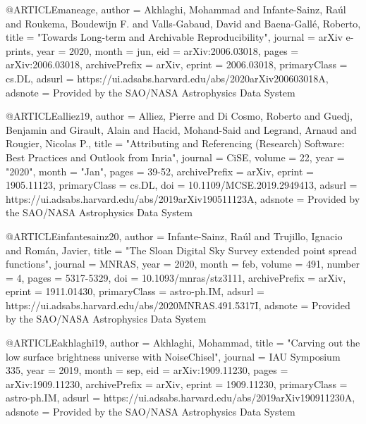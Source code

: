 %
%

@ARTICLE{maneage,
       author = {{Akhlaghi}, Mohammad and {Infante-Sainz}, Ra{\'u}l and
         {Roukema}, Boudewijn F. and {Valls-Gabaud}, David and
         {Baena-Gall{\'e}}, Roberto},
        title = "{Towards Long-term and Archivable Reproducibility}",
      journal = {arXiv e-prints},
         year = 2020,
        month = jun,
          eid = {arXiv:2006.03018},
        pages = {arXiv:2006.03018},
archivePrefix = {arXiv},
       eprint = {2006.03018},
 primaryClass = {cs.DL},
       adsurl = {https://ui.adsabs.harvard.edu/abs/2020arXiv200603018A},
      adsnote = {Provided by the SAO/NASA Astrophysics Data System}
}





@ARTICLE{alliez19,
       author = {{Alliez}, Pierre and {Di Cosmo}, Roberto and {Guedj}, Benjamin and
         {Girault}, Alain and {Hacid}, Mohand-Said and {Legrand}, Arnaud and
         {Rougier}, Nicolas P.},
        title = "{Attributing and Referencing (Research) Software: Best Practices and Outlook from Inria}",
      journal = {CiSE},
       volume = {22},
         year = "2020",
        month = "Jan",
        pages = {39-52},
archivePrefix = {arXiv},
       eprint = {1905.11123},
 primaryClass = {cs.DL},
          doi = {10.1109/MCSE.2019.2949413},
       adsurl = {https://ui.adsabs.harvard.edu/abs/2019arXiv190511123A},
      adsnote = {Provided by the SAO/NASA Astrophysics Data System}
}





@ARTICLE{infantesainz20,
       author = {{Infante-Sainz}, Ra{\'u}l and {Trujillo}, Ignacio and
         {Rom{\'a}n}, Javier},
        title = "{The Sloan Digital Sky Survey extended point spread functions}",
      journal = {MNRAS},
         year = 2020,
        month = feb,
       volume = {491},
       number = {4},
        pages = {5317-5329},
          doi = {10.1093/mnras/stz3111},
archivePrefix = {arXiv},
       eprint = {1911.01430},
 primaryClass = {astro-ph.IM},
       adsurl = {https://ui.adsabs.harvard.edu/abs/2020MNRAS.491.5317I},
      adsnote = {Provided by the SAO/NASA Astrophysics Data System}
}





@ARTICLE{akhlaghi19,
       author = {{Akhlaghi}, Mohammad},
        title = "{Carving out the low surface brightness universe with NoiseChisel}",
      journal = {IAU Symposium 335},
         year = 2019,
        month = sep,
          eid = {arXiv:1909.11230},
        pages = {arXiv:1909.11230},
archivePrefix = {arXiv},
       eprint = {1909.11230},
 primaryClass = {astro-ph.IM},
       adsurl = {https://ui.adsabs.harvard.edu/abs/2019arXiv190911230A},
      adsnote = {Provided by the SAO/NASA Astrophysics Data System}
}
